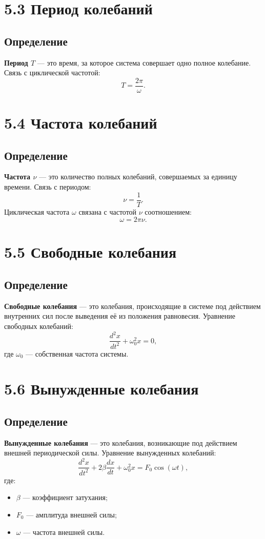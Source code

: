 \documentclass[a4paper, 12pt]{article}
\begin{document}
\section*{5.3 Период колебаний}
\vspace{-9pt}
\subsection*{Определение}
\vspace{-3pt}
\textbf{Период $T$} — это время, за которое система совершает одно полное колебание. Связь с циклической частотой:
$$ T = \frac{2\pi}{\omega}.$$

\section*{5.4 Частота колебаний}
\vspace{-9pt}
\subsection*{Определение}
\vspace{-3pt}
\textbf{Частота $\nu$} — это количество полных колебаний, совершаемых за единицу времени. Связь с периодом:
$$ \nu = \frac{1}{T}.$$
Циклическая частота $\omega$ связана с частотой $\nu$ соотношением:
$$ \omega = 2\pi \nu.$$

\section*{5.5 Свободные колебания}
\vspace{-9pt}
\subsection*{Определение}
\vspace{-3pt}
\textbf{Свободные колебания} — это колебания, происходящие в системе под действием внутренних сил после выведения её из положения равновесия. Уравнение свободных колебаний:
$$ \frac{d^2x}{dt^2} + \omega_0^2 x = 0,$$
где $ \omega_0$ — собственная частота системы.

\section*{5.6 Вынужденные колебания}
\vspace{-9pt}
\subsection*{Определение}
\vspace{-3pt}
\textbf{Вынужденные колебания} — это колебания, возникающие под действием внешней периодической силы. Уравнение вынужденных колебаний:
$$ \frac{d^2x}{dt^2} + 2\beta \frac{dx}{dt} + \omega_0^2 x = F_0 \cos(\omega t),$$
где:
\begin{itemize}[itemsep=0pt, topsep=0pt, parsep=0pt]
  \item $ \beta$ — коэффициент затухания;
  \item $ F_0$ — амплитуда внешней силы;
  \item $ \omega$ — частота внешней силы.
\end{itemize}
\end{document}
